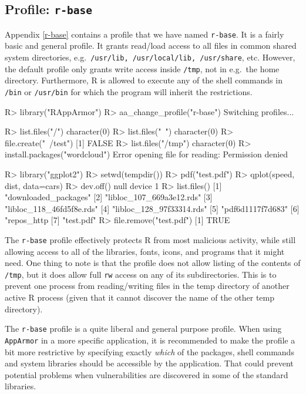 \documentclass{jss}
\newcommand{\R}{\textsf{R}\xspace}
\newcommand{\AppArmor}{\texttt{AppArmor}\xspace}
\begin{document}
\subsection[Profile: r-base]{Profile: \texttt{r-base}}
\label{r-base-intro}

Appendix \ref{r-base} contains a profile that we have named \texttt{r-base}.
It is a fairly basic and general profile. It grants read/load access to all
files in common shared system directories, e.g.\ \texttt{/usr/lib,
/usr/local/lib, /usr/share}, etc. However, the default profile only grants
write access inside \texttt{/tmp}, not in e.g.\ the home directory. Furthermore,
\R is allowed to execute any of the shell commands in \texttt{/bin}
or \texttt{/usr/bin} for which the program will inherit the restrictions.

\begin{CodeChunk}
\begin{CodeInput}
R> library("RAppArmor")
R> aa_change_profile("r-base")
Switching profiles...

R> list.files("/")
character(0)
R> list.files("~")
character(0)
R> file.create("~/test")
[1] FALSE
R> list.files("/tmp")
character(0)
R> install.packages("wordcloud")
Error opening file for reading: Permission denied

R> library("ggplot2")
R> setwd(tempdir())
R> pdf("test.pdf")
R> qplot(speed, dist, data=cars)
R> dev.off()
null device
          1
R> list.files()
[1] "downloaded_packages"
[2] "libloc_107_669a3e12.rds"
[3] "libloc_118_46fd5f8e.rds"
[4] "libloc_128_97f33314.rds"
[5] "pdf6d1117f7d683"
[6] "repos_http%
[7] "test.pdf"
R> file.remove("test.pdf")
[1] TRUE
\end{CodeInput}
\end{CodeChunk}

The \texttt{r-base} profile effectively protects \R from most malicious
activity, while still allowing access to all of the libraries, fonts, icons,
and programs that it might need. One thing to note is that the profile does not
allow listing of the contents of \texttt{/tmp}, but it does allow full
\texttt{rw} access on any of its subdirectories. This is to prevent one process
from reading/writing files in the temp directory of another active \R process
(given that it cannot discover the name of the other temp directory).

The \texttt{r-base} profile is a quite liberal and general purpose profile.
When using \AppArmor in a more specific application, it is recommended to make
the profile a bit more restrictive by specifying exactly \emph{which} of the
packages, shell commands and system libraries should be accessible by the
application. That could prevent potential problems when vulnerabilities are
discovered in some of the standard libraries.
\end{document}
